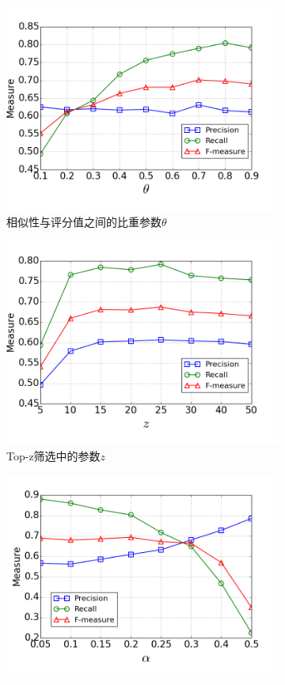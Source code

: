 \begin{figure}
\begin{subfigure}[b]{0.49\textwidth}
		\includegraphics[width=\textwidth]{figures/para_theta}
		\caption{相似性与评分值之间的比重参数$\theta$}
	\end{subfigure}
	\begin{subfigure}[b]{0.49\textwidth}
		\includegraphics[width=\textwidth]{figures/para_z}
		\caption{Top-z筛选中的参数$z$}
	\end{subfigure}
	\begin{subfigure}[b]{0.49\textwidth}
		\includegraphics[width=\textwidth]{figures/para_alpha}

\end{subfigure}
\end{figure}
